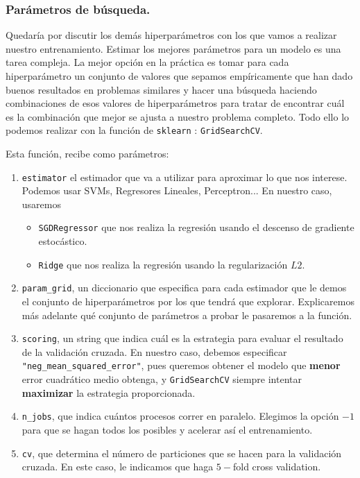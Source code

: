 \documentclass[a4paper, 20pt]{article}
\begin{document}
\subsubsection{Parámetros de búsqueda.}

Quedaría por discutir los demás hiperparámetros con los que vamos a realizar nuestro entrenamiento. Estimar los mejores parámetros para un modelo es una tarea compleja. La mejor opción en la práctica es tomar para cada hiperparámetro un conjunto de valores que sepamos empíricamente que han dado buenos resultados en problemas similares y hacer una búsqueda haciendo combinaciones de esos valores de hiperparámetros para tratar de encontrar cuál es la combinación que mejor se ajusta a nuestro problema completo. Todo ello lo podemos realizar con la función de \lstinline{sklearn} :  \lstinline{GridSearchCV}.

Esta función, recibe como parámetros:
\begin{enumerate}
\item \lstinline{estimator} el estimador que va a utilizar para aproximar lo que nos interese. Podemos usar SVMs, Regresores Lineales, Perceptron... En nuestro caso, usaremos
  \begin{itemize}
  \item \lstinline{SGDRegressor} que nos realiza la regresión usando el descenso de gradiente estocástico.
  \item \lstinline{Ridge} que nos realiza la regresión usando la regularización $L2$.
  \end{itemize}
\item \lstinline{param_grid}, un diccionario que especifica para cada estimador que le demos el conjunto de hiperparámetros por los que tendrá que explorar. Explicaremos más adelante qué conjunto de parámetros a probar le pasaremos a la función.
\item \lstinline{scoring}, un string que indica cuál es la estrategia para evaluar el resultado de la validación cruzada. En nuestro caso, debemos especificar \lstinline{"neg_mean_squared_error"}, pues queremos obtener el modelo que \textbf{menor} error cuadrático medio obtenga, y \lstinline{GridSearchCV} siempre intentar \textbf{maximizar} la estrategia proporcionada.
\item \lstinline{n_jobs}, que indica cuántos procesos correr en paralelo. Elegimos la opción $-1$ para que se hagan todos los posibles y acelerar así el entrenamiento.

\item \lstinline{cv}, que determina el número de particiones que se hacen para la validación cruzada. En este caso, le indicamos que haga $5-$fold cross validation.


\end{enumerate}
\end{document}
